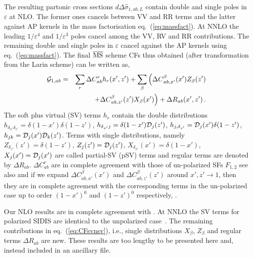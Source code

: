 \documentclass[%
 twocolumn,
 superscriptaddress,
 preprintnumbers,
 nofootinbib,
 amsmath,amssymb,
 aps,
 prl,
]{revtex4}
\begin{document}
{The resulting partonic cross sections $d \Delta \hat{\sigma}_{1,ab,L}$ contain
double and single poles in $\varepsilon$ at NLO. 
The former ones cancels between VV and RR terms and the latter against AP kernels in the mass factorisation eq.~(\ref{eq:massfact}). 
At NNLO the leading $1/\varepsilon^4$ and $1/\varepsilon^3$ poles cancel among  the VV, RV and RR contributions. 
The remaining double and single poles in $\varepsilon$ cancel against the AP kernels using eq.~(\ref{eq:massfact}). 
The final $\overline{\rm{MS}}$ scheme CFs thus obtained 
(after transformation from the Larin scheme) can be written as, 
%
\begin{eqnarray}
\label{eq:CFsvnsv}
{\cal G}_{1,ab} &=&  \sum_{r}
\Delta C_{ab}^r  h_r (x',z')  
+ \sum_{\beta} \Big({\Delta C }_{ab,x'}^\beta(x') Z_\beta(z')\nonumber \\
&&+ {\Delta C}_{ab,z'}^\beta(z') X_\beta(x')\Big)
+ \Delta R_{ab}(x',z')
\, .
\end{eqnarray}
%
The soft plus virtual (SV) terms $h_r$ contain the double distributions 
$h_{\delta_{x'} \delta_{z'}}=\delta(1-x') \delta(1-z')$, 
$h_{\delta_{x'} j}= \delta(1-x') {\cal D}_j(z')$, 
$h_{j, \delta_{z'}} = {\cal D}_j(x') \delta(1-z')$,   
$h_{j k}=  {\cal D}_j(x') {\cal D}_k(z')$. 
Terms with single distributions, namely 
$Z_{\delta_{z'}}(z') =\delta(1-z')$,  
$Z_{j}(z') ={\cal D}_j(z')$, 
$X_{\delta_{x'}}(x')=\delta(1-x')$, 
$X_j(x')={\cal D}_j(x') $ 
are called partial-SV (pSV) terms and regular terms are denoted by $\Delta R_{ab}$. 
$\Delta C_{ab}^r $ are in complete agreement with those of un-polarized SFs $F_{1,2}$ \cite{Abele:2021nyo,Goyal:2023xfi,Bonino:2024qbh,Goyal:2024xxx} see also \cite{Ravindran:2006bu,Ahmed:2014uya} and if we expand ${\Delta C }_{ab,x'}^\beta(x')$ and  ${\Delta C}_{ab,z'}^\beta(z')$ around $x', z' \rightarrow 1$, then they are in complete agreement with the corresponding terms in the un-polarized case up to order $(1-x')^{0}$ and $(1-z')^{0}$ respectively, \cite{Bonino:2024qbh,Goyal:2024xxx,AH:2020qoa}. 


Our NLO results are in complete agreement with \cite{deFlorian:1997zj}.
At NNLO the SV terms for polarized SIDIS are identical to the unpolarized case~\cite{Abele:2021nyo}. 
The remaining contributions in eq.~(\ref{eq:CFsvnsv}), i.e., single distributions $X_\beta$, $Z_\beta$
and regular terms $\Delta R_{ab}$ are new. 
These results are too lengthy to be presented here and, instead included in an ancillary file. 

}
\end{document}
